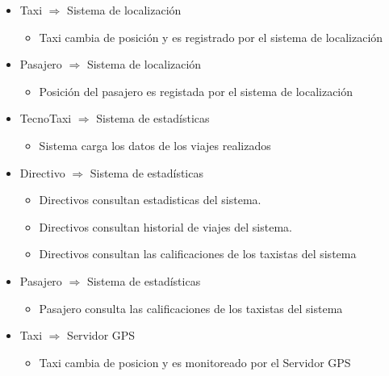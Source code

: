 \begin{itemize}
\begin{itemize}
    \end{itemize}	
        \item Taxi $\Rightarrow$ Sistema de localizaci\'on
  		\begin{itemize}
        \item Taxi cambia de posici\'on y es registrado por el sistema de localizaci\'on
         \end{itemize}	

    \item Pasajero $\Rightarrow$ Sistema de localizaci\'on
    \begin{itemize}
        \item Posici\'on del pasajero es registada por el sistema de localizaci\'on
        \end{itemize}	


    \item TecnoTaxi $\Rightarrow$ Sistema de estad\'isticas
    
     \begin{itemize}
        \item Sistema carga los datos de los viajes realizados
    \end{itemize}	

    \item Directivo $\Rightarrow$ Sistema de estad\'isticas
    \begin{itemize}
        \item Directivos consultan estadisticas del sistema.
        \item Directivos consultan historial de viajes del sistema.
        \item Directivos consultan las calificaciones de los taxistas del sistema
    \end{itemize} 

     \item Pasajero $\Rightarrow$ Sistema de estad\'isticas
    \begin{itemize}
         \item Pasajero consulta las calificaciones de los taxistas del sistema
    \end{itemize}


    \item Taxi $\Rightarrow$ Servidor GPS
    \begin{itemize}
        \item Taxi cambia de posicion y es monitoreado por el Servidor GPS
    \end{itemize} 

\end{itemize}


